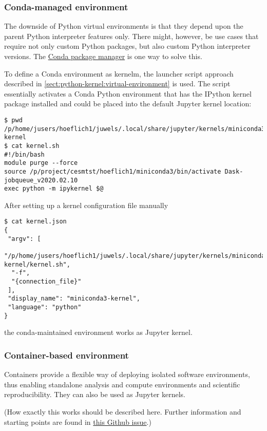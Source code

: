\subsubsection{Conda-managed environment}
\label{sect:conda-environment}

The downside of Python virtual environments is that they depend upon the parent Python interpreter features only.
There might, however, be use cases that require not only custom Python packages, but also custom Python interpreter versions.
The \href{https://conda.io/en/latest/}{Conda package manager} is one way to solve this.

To define a Conda environment as kernelm, the launcher script approach described in \ref{sect:python-kernel:virtual-environment} is used.
The script essentially activates a Conda Python environment that has the IPython kernel package installed and could be placed into the default Jupyter kernel location:
%
\begin{verbatim}
$ pwd
/p/home/jusers/hoeflich1/juwels/.local/share/jupyter/kernels/miniconda3-kernel
$ cat kernel.sh
#!/bin/bash
module purge --force
source /p/project/cesmtst/hoeflich1/miniconda3/bin/activate Dask-jobqueue_v2020.02.10
exec python -m ipykernel $@
\end{verbatim}

After setting up a kernel configuration file manually
%
\begin{verbatim}
$ cat kernel.json
{
 "argv": [
  "/p/home/jusers/hoeflich1/juwels/.local/share/jupyter/kernels/miniconda3-kernel/kernel.sh",
  "-f",
  "{connection_file}"
 ],
 "display_name": "miniconda3-kernel",
 "language": "python"
}
\end{verbatim}
%
the conda-maintained environment works as Jupyter kernel.


\subsubsection{Container-based environment}
\label{sect:container-based-environment}

Containers provide a flexible way of deploying isolated software environments, thus enabling standalone analysis and compute environments and scientific reproducibility.
They can also be used as Jupyter kernels.

(How exactly this works should be described here. Further information and starting points are found in \href{https://github.com/ExaESM-WP4/JupyterHub-Evaluation-Whitepaper/issues/6}{this Github issue}.)
